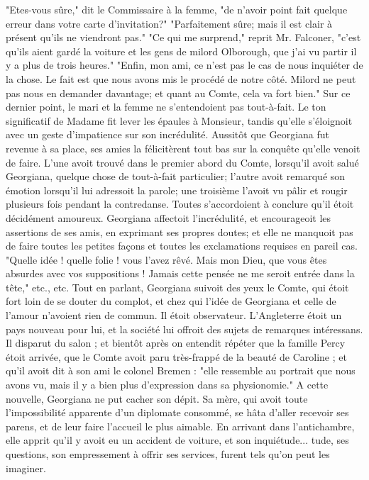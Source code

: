 "Etes-vous sûre," dit le Commissaire à la femme, "de n'avoir point fait quelque erreur dans votre carte d'invitation?"
"Parfaitement sûre; mais il est clair à
présent qu'ils ne viendront pas."\setcounter{page}{131} "Ce qui me surprend," reprit Mr. Falconer, "c’est qu’ils aient gardé la voiture et les gens de milord Olborough, que j’ai vu partir il y a plus de trois heures." "Enfin, mon ami, ce n’est pas le cas de nous inquiéter de la chose. Le fait est que nous avons mis le procédé de notre côté. Milord ne peut pas nous en demander davantage; et quant au Comte, cela va fort bien." Sur ce dernier point, le mari et la femme ne s’entendoient pas tout-à-fait. Le ton significatif de Madame fit lever les épaules à Monsieur, tandis qu’elle s’éloignoit avec un geste d’impatience sur son incrédulité. Aussitôt que Georgiana fut revenue à sa place, ses amies la félicitèrent tout bas sur la conquête qu’elle venoit de faire. L’une avoit trouvé dans le premier abord du Comte, lorsqu’il avoit salué Georgiana, quelque chose de tout-à-fait particulier; l’autre avoit remarqué son émotion lorsqu’il lui adressoit la parole; une troisième l’avoit vu pâlir et rougir plusieurs fois pendant la contredanse. Toutes s’accordoient à conclure qu’il étoit décidément amoureux. Georgiana affectoit l’incrédulité, et encourageoit les assertions de ses amis, en exprimant ses propres doutes;\setcounter{page}{132} et elle ne manquoit pas de faire toutes les petites façons et toutes les exclamations requises en pareil cas. "Quelle idée ! quelle folie ! vous l'avez rêvé. Mais mon Dieu, que vous êtes absurdes avec vos suppositions ! Jamais cette pensée ne me seroit entrée dans la tête," etc., etc.
Tout en parlant, Georgiana suivoit des yeux le Comte, qui étoit fort loin de se douter du complot, et chez qui l'idée de Georgiana et celle de l'amour n'avoient rien de commun.
Il étoit observateur. L'Angleterre étoit un pays nouveau pour lui, et la société lui offroit des sujets de remarques intéressans. Il disparut du salon ; et bientôt après on entendit répéter que la famille Percy étoit arrivée, que le Comte avoit paru très-frappé de la beauté de Caroline ; et qu'il avoit dit à son ami le colonel Bremen : "elle ressemble au portrait que nous avons vu, mais il y a bien plus d'expression dans sa physionomie."
A cette nouvelle, Georgiana ne put cacher son dépit. Sa mère, qui avoit toute l'impossibilité apparente d'un diplomate consommé, se hâta d'aller recevoir ses parens, et de leur faire l'accueil le plus aimable. En arrivant dans l'antichambre, elle apprit qu'il y avoit eu un accident de voiture, et son inquiétude...\setcounter{page}{133} tude, ses questions, son empressement à offrir ses services, furent tels qu'on peut les imaginer.
